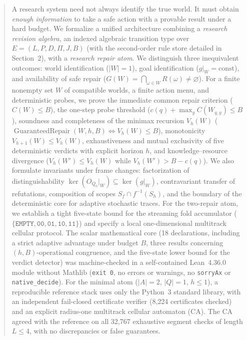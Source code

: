 \documentclass[11pt,a4paper]{article}
\theoremstyle{preprintthm}
\theoremstyle{preprintdef}
\newcommand{\kerrel}{\operatorname{ker}}
\begin{document}
\begin{abstract}
\noindent
A research system need not always identify the true world. It must obtain \emph{enough information} to take a safe action with a provable result under a hard budget. We formalize a unified architecture combining a \emph{research revision algebra}, an indexed algebraic transition type over $E=(L,P,D,\Pi,J,B)$ (with the second-order rule store detailed in Section~2), with a \emph{research repair atom}. We distinguish three inequivalent outcomes: world identification ($|W|=1$), goal identification ($g|_W=\mathrm{const}$), and availability of safe repair ($G(W)=\bigcap_{\omega\in W}R(\omega)\ne\varnothing$). For a finite nonempty set $W$ of compatible worlds, a finite action menu, and deterministic probes, we prove the immediate common repair criterion ($C(W)\le B$), the one-step probe threshold ($c(q)+\max_y C(W_{q,y})\le B$), soundness and completeness of the minimax recursion $V_h(W)$ ($\operatorname{GuaranteedRepair}(W,h,B)\iff V_h(W)\le B$), monotonicity $V_{h+1}(W)\le V_h(W)$, exhaustiveness and mutual exclusivity of five deterministic verdicts with explicit horizon $h$, and knowledge--resource divergence ($V_h(W')\le V_h(W)$ while $V_h(W')>B-c(q)$). We also formulate invariants under frame changes: factorization of distinguishability $\kerrel(O_{Q_0}|_W)\subseteq\kerrel(g|_W)$, contravariant transfer of refutations, composition of scopes $S_f\cap f^{-1}(S_h)$, and the boundary of the deterministic core for adaptive stochastic traces. For the two-repair atom, we establish a tight five-state bound for the streaming fold accumulator ($\{\texttt{EMPTY},\texttt{00},\texttt{01},\texttt{10},\texttt{11}\}$) and specify a local one-dimensional multitrack cellular protocol. The scalar mathematical core (18 declarations, including a strict adaptive advantage under budget $B$, three results concerning $(h,B)$-operational congruence, and the five-state lower bound for the verdict detector) was machine-checked in a self-contained Lean~4.36.0 module without Mathlib (\texttt{exit 0}, no errors or warnings, no \texttt{sorryAx} or \texttt{native\_decide}). For the minimal atom ($|A|=2$, $|Q|=1$, $h\le1$), a reproducible reference stack uses only the Python~3 standard library, with an independent fail-closed certificate verifier (8,224 certificates checked) and an explicit radius-one multitrack cellular automaton (CA). The CA agreed with the reference on all 32,767 exhaustive segment checks of length $L\le4$, with no discrepancies or false guarantees.
\end{abstract}
\end{document}
